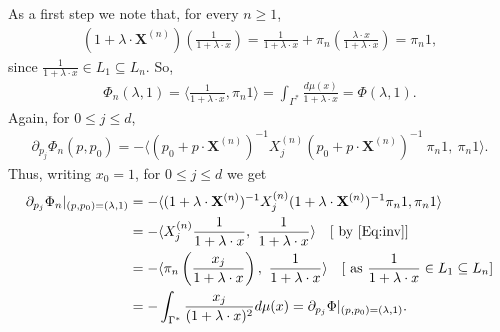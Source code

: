 \documentclass[11pt,reqno]{amsart}
\theoremstyle{plain}
\theoremstyle{definition}
\numberwithin{equation}{section}
\begin{document}
 As a first step we note that, for every $n\geq 1$,
	\begin{align}\label{Eq:inv}
		(1 + \lambda \cdot \mathbf{X}^{(n)}) \left(\frac{1}{1+ \lambda \cdot x} \right) = \frac{1}{1+ \lambda \cdot x} + \pi_n  \left(\frac{\lambda \cdot x}{1+ \lambda \cdot x} \right)  =  \pi_n 1, 
	\end{align}
since $\frac{1}{1+ \lambda \cdot x} \in L_1 \subseteq L_n$. So, 
\begin{align*}
    \Phi_n(\lambda, 1) = \langle \frac{1}{1+ \lambda \cdot x}, \pi_n 1  \rangle 
                       = \int_{\Gamma^*} \frac{d\mu(x)}{1+ \lambda \cdot x} = \Phi(\lambda, 1).
\end{align*}
Again, for $0 \leq j \leq d$,
	\begin{align*}
		\partial_{p_j} \Phi_n (p, p_0)  = -  \langle (p_0 + p \cdot \mathbf{X}^{(n)})^{-1}  X^{(n)}_j   (p_0 + p \cdot \mathbf{X}^{(n)})^{-1} \ \pi_n 1, \ \pi_n 1  \rangle.  
	\end{align*}
Thus, writing $x_0 =1$, for $0 \leq j \leq d$ we get 
	\begin{align*}
		\partial_{p_j} \Phi_n|_{(p, p_0) =(\lambda, 1)} &= -  \langle (1 + \lambda \cdot \mathbf{X}^{(n)})^{-1}  X^{(n)}_j   (1 + \lambda \cdot \mathbf{X}^{(n)})^{-1} \pi_n 1, \pi_n 1 \rangle \\
		& = -  \langle  X^{(n)}_j   \frac{1}{1 + \lambda \cdot x}, \ \frac{1}{1 + \lambda \cdot x}  \rangle \ \ \ [\text{ by } \eqref{Eq:inv}] \\
		&= -  \langle  \pi_n  \left(\frac{x_j}{1 + \lambda \cdot x}\right), \ \frac{1}{1 + \lambda \cdot x} \rangle \ \ \ [\text{ as } \frac{1}{1+\lambda \cdot x} \in L_1 \subseteq L_n]  \\
		& = - \int_{\Gamma^*} \frac{x_j}{(1 + \lambda \cdot x)^2} d\mu(x) = \partial_{p_j} \Phi|_{(p, p_0) =(\lambda, 1)}.
	\end{align*}
	
\end{document}
